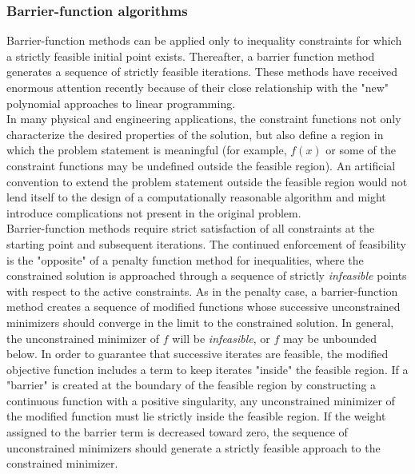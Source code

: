 \subsubsection{Barrier-function algorithms}
Barrier-function methods can be applied only to inequality constraints for which a strictly feasible initial point exists. Thereafter, a barrier function method generates a sequence of strictly feasible iterations. These methods have received enormous attention recently because of their close relationship with the "new" polynomial approaches to linear programming.\cite{Han111, Gill,Haestene2} \\
\indent In many physical and engineering applications, the constraint functions not only characterize the desired properties of the solution, but also define a region in which the problem statement is meaningful (for example, $f(x)$ or some of the constraint functions may be undefined outside the feasible region). An artificial convention to extend the problem statement outside the feasible region would not lend itself to the design of a computationally reasonable algorithm and might introduce complications not present in the original problem.\cite{Boyd111}\\
\indent Barrier-function methods require strict satisfaction of all constraints at the starting point and subsequent iterations. The continued enforcement of feasibility is the "opposite" of a penalty function method for inequalities, where the constrained solution is approached through a sequence of strictly \textit{infeasible} points with respect to the active constraints.  As in the penalty case, a barrier-function method creates a sequence of modified functions whose successive unconstrained minimizers should converge in the limit to the constrained solution. In general, the unconstrained minimizer of $f$ will be \textit{infeasible}, or $f$ may be unbounded below. In order to guarantee that successive iterates are feasible, the modified objective function includes a term to keep iterates "inside" the feasible region. If a "barrier" is created at the boundary of the feasible region by constructing a continuous function with a positive singularity, any unconstrained minimizer of the modified function must lie strictly inside the feasible region. If the weight assigned to the barrier term is decreased toward zero, the sequence of unconstrained minimizers should generate a strictly feasible approach to the constrained minimizer.\cite{Haestene2}